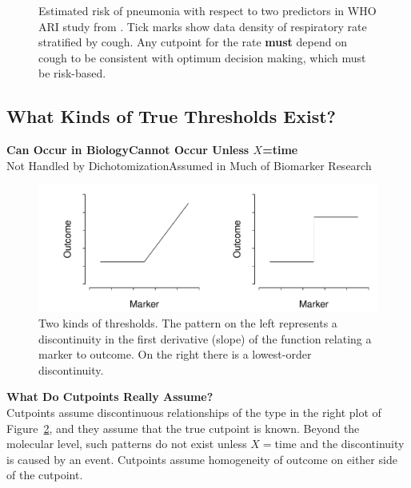 \begin{Schunk}
\begin{figure}[htbp]
\caption[Risk of pneumonia with two predictors]{Estimated risk of pneumonia with respect to two predictors in WHO ARI study from \citet{har98dev}.  Tick marks show data density of respiratory rate stratified by cough.  Any cutpoint for the rate \textbf{must} depend on cough to be consistent with optimum decision making, which must be risk-based.}\label{fig:info-pneuwho}
\end{figure}
\end{Schunk}
\clearpage
\subsection{What Kinds of True Thresholds Exist?}

\vspace{0.3in}

\textbf{Can Occur in Biology}\hfill \textbf{Cannot Occur \smaller Unless $X$=time}\\
{\smaller[2] Not Handled by Dichotomization}\hfill {\smaller[2] Assumed in Much of Biomarker Research}
\begin{Schunk}
\begin{figure}[htbp]

\centerline{\includegraphics{info-thresholds-1} }

\caption[Two kinds of thresholds]{Two kinds of thresholds.  The pattern on the left represents a discontinuity in the first derivative (slope) of the function relating a marker to outcome.  On the right there is a lowest-order discontinuity.}\label{fig:info-thresholds}
\end{figure}
\end{Schunk}

\textbf{What Do Cutpoints Really Assume?}\\
Cutpoints assume discontinuous relationships of the type in the right
plot of Figure~\ref{fig:info-thresholds}, and they assume that the
true cutpoint is known.  Beyond the molecular level, such patterns do
not exist unless $X=$time and the discontinuity is caused by an event.
Cutpoints assume homogeneity of outcome on either side of the cutpoint.

